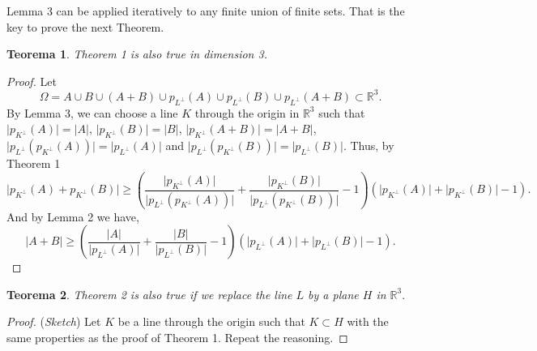 \documentclass[12pt]{article}
\newcommand{\R}{\mathbb{R}}
\newtheorem{theorem}{Teorema}
\begin{document}
Lemma 3 can be applied iteratively to any finite union of finite sets. That is the key to prove the next Theorem.

\begin{theorem}
    Theorem 1 is also true in dimension 3.
\end{theorem}
\begin{proof}
    Let 
    $$\Omega = A \cup B \cup (A + B) \cup p_{L^\perp}(A) \cup p_{L^\perp}(B) \cup p_{L^\perp}(A+B) \subset \R^3.$$
    By Lemma 3, we can choose a line $K$ through the origin in $\R^3$ such that
    $\lvert p_{K^\perp}(A) \rvert = \lvert A \rvert$, $\lvert p_{K^\perp}(B) \rvert = \lvert B \rvert$, $\lvert p_{K^\perp}(A + B) \rvert = \lvert A + B\rvert$, $\lvert p_{L^\perp}(p_{K^\perp}(A)) \rvert = \lvert p_{L^\perp}(A) \rvert$ and $\lvert p_{L^\perp}(p_{K^\perp}(B)) \rvert = \lvert p_{L^\perp}(B) \rvert$. Thus, by Theorem 1
    $$\lvert   p_{K^\perp}(A) +  p_{K^\perp}(B) \rvert \geq \left( \frac{\lvert  p_{K^\perp}(A) \rvert }{\lvert  p_{L^\perp}(p_{K^\perp}(A))  \rvert} + \frac{\lvert  p_{K^\perp}(B) \rvert }{\lvert  p_{L^\perp}(p_{K^\perp}(B))  \rvert } - 1\right) \left( \lvert p_{K^\perp}(A) \rvert + \lvert p_{K^\perp}(B) \rvert - 1 \right).$$ And by Lemma 2 we have,
     $$\lvert A + B \rvert \geq \left( \frac{\lvert A \rvert }{\lvert p_{L^\perp}(A) \rvert} + \frac{\lvert B \rvert }{\lvert p_{L^\perp} (B) \rvert } - 1\right) \left( \lvert p_{L^\perp}(A) \rvert + \lvert p_{L^\perp}(B) \rvert - 1 \right).$$
\end{proof}


\begin{theorem}
    Theorem 2 is also true if we replace the line $L$ by a plane $H$ in $\R^3.$
\end{theorem}
\begin{proof} (\textit{Sketch})
    Let $K$ be a line through the origin such that $K \subset H$ with the same properties as the proof of Theorem 1. Repeat the reasoning.  
\end{proof}
\end{document}
